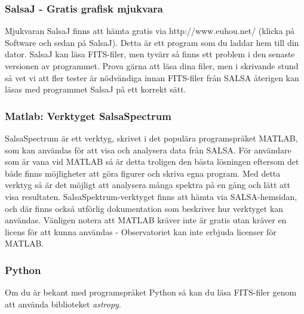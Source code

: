 \subsubsection{SalsaJ - Gratis grafisk mjukvara}
Mjukvaran SalsaJ finns att hämta gratis via http://www.euhou.net/ (klicka på Software
och sedan på SalsaJ).  Detta är ett program som du laddar hem till din dator.
SalsaJ kan läsa FITS-filer, men tyvärr så finns ett problem i den senaste
versionen av programmet. Prova gärna att läsa dina filer, men i skrivande stund så
vet vi att fler tester är nödvändiga innan FITS-filer från SALSA återigen kan läsas
med programmet SalsaJ på ett korrekt sätt. 

\subsubsection{Matlab: Verktyget SalsaSpectrum}
SalsaSpectrum är ett verktyg, skrivet i det populära programspråket MATLAB,
som kan användas för att visa och analysera data från SALSA. För användare som
är vana vid MATLAB så är detta troligen den bästa lösningen eftersom det både finns
möjligheter att göra figurer och skriva egna program. Med detta verktyg så
är det möjligt att analysera många spektra på en gång och lätt att visa resultaten. 
SalsaSpektrum-verktyget finns att hämta via SALSA-hemsidan, och där finns också
utförlig dokumentation som beskriver hur verktyget kan användas. Vänligen 
notera att MATLAB kräver inte är gratis utan kräver en licens för att kunna
användas - Observatoriet kan inte erbjuda licenser för MATLAB.

\subsubsection{Python}
Om du är bekant med programspråket Python så kan du läsa FITS-filer genom att använda
biblioteket \emph{astropy}.
